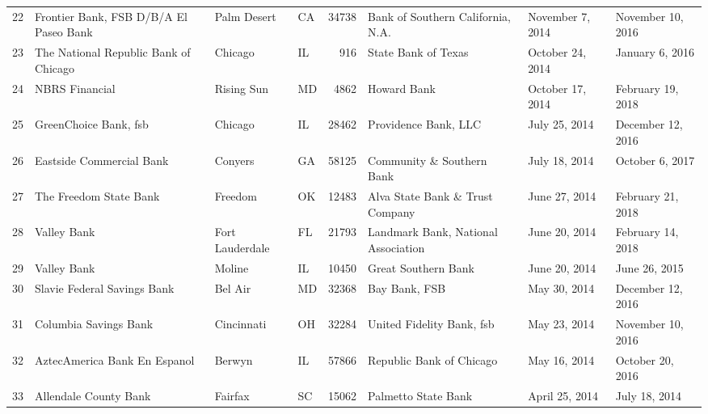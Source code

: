 \begin{tabular}{llllrlll}
22  &             Frontier Bank, FSB D/B/A El Paseo Bank &         Palm Desert &  CA &  34738 &                  Bank of Southern California, N.A. &    November 7, 2014 &   November 10, 2016 \\
23  &              The National Republic Bank of Chicago &             Chicago &  IL &    916 &                                State Bank of Texas &    October 24, 2014 &     January 6, 2016 \\
24  &                                     NBRS Financial &          Rising Sun &  MD &   4862 &                                        Howard Bank &    October 17, 2014 &   February 19, 2018 \\
25  &                              GreenChoice Bank, fsb &             Chicago &  IL &  28462 &                               Providence Bank, LLC &       July 25, 2014 &   December 12, 2016 \\
26  &                           Eastside Commercial Bank &             Conyers &  GA &  58125 &                          Community \& Southern Bank &       July 18, 2014 &     October 6, 2017 \\
27  &                             The Freedom State Bank &             Freedom &  OK &  12483 &                    Alva State Bank \& Trust Company &       June 27, 2014 &   February 21, 2018 \\
28  &                                        Valley Bank &     Fort Lauderdale &  FL &  21793 &                Landmark Bank, National Association &       June 20, 2014 &   February 14, 2018 \\
29  &                                        Valley Bank &              Moline &  IL &  10450 &                                Great Southern Bank &       June 20, 2014 &       June 26, 2015 \\
30  &                        Slavie Federal Savings Bank &             Bel Air &  MD &  32368 &                                      Bay Bank, FSB &        May 30, 2014 &   December 12, 2016 \\
31  &                              Columbia Savings Bank &          Cincinnati &  OH &  32284 &                          United Fidelity Bank, fsb &        May 23, 2014 &   November 10, 2016 \\
32  &                       AztecAmerica Bank En Espanol &              Berwyn &  IL &  57866 &                           Republic Bank of Chicago &        May 16, 2014 &    October 20, 2016 \\
33  &                              Allendale County Bank &             Fairfax &  SC &  15062 &                                Palmetto State Bank &      April 25, 2014 &       July 18, 2014 \\

\end{tabular}
